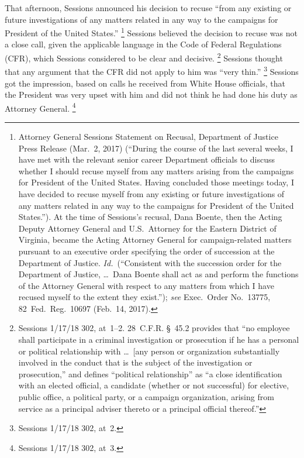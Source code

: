 That afternoon, Sessions announced his decision to recuse ``from any existing or future investigations of any matters related in any way to the campaigns for President of the United States.''%
\footnote{Attorney General Sessions Statement on Recusal, Department of Justice Press Release (Mar.~2, 2017) (``During the course of the last several weeks, I have met with the relevant senior career Department officials to discuss whether I should recuse myself from any matters arising from the campaigns for President of the United States.
Having concluded those meetings today, I have decided to recuse myself from any existing or future investigations of any matters related in any way to the campaigns for President of the United States.'').
At the time of Sessions's recusal, Dana Boente, then the Acting Deputy Attorney General and U.S.~Attorney for the Eastern District of Virginia, became the Acting Attorney General for campaign-related matters pursuant to an executive order specifying the order of succession at the Department of Justice.
\textit{Id.}~(``Consistent with the succession order for the Department of Justice, \dots\ Dana Boente shall act as and perform the functions of the Attorney General with respect to any matters from which I have recused myself to the extent they exist.'');
\textit{see} Exec.\ Order No.~13775, 82~Fed.\ Reg.\ 10697 (Feb.~14, 2017).}
Sessions believed the decision to recuse was not a close call, given the applicable language in the Code of Federal Regulations (CFR), which Sessions considered to be clear and decisive.%
\footnote{Sessions 1/17/18 302, at~1--2. 28~C.F.R. \S~45.2 provides that ``no employee shall participate in a criminal investigation or prosecution if he has a personal or political relationship with \dots\ [any person or organization substantially involved in the conduct that is the subject of the investigation or prosecution,'' and defines ``political relationship'' as ``a close identification with an elected official, a candidate (whether or not successful) for elective, public office, a political party, or a campaign organization, arising from service as a principal adviser thereto or a principal official thereof.''}
Sessions thought that any argument that the CFR did not apply to him was ``very thin.''%
\footnote{Sessions 1/17/18 302, at~2.}
Sessions got the impression, based on calls he received from White House officials, that the President was very upset with him and did not think he had done his duty as Attorney General.%
\footnote{Sessions 1/17/18 302, at~3.}

